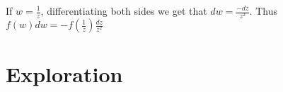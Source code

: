 \documentclass{homework}
\begin{document}
                                                                                                             \begin{solution}
                                                                                                             If $w=\frac{1}{z}$, differentiating both sides we get that $dw = \frac{-dz}{z^2}$. Thus $f(w) dw = -f(\frac{1}{z})\frac{dz}{z^2}$

                                                                                                             \end{solution}
                                                                                                             \section{Exploration}
\end{document}
